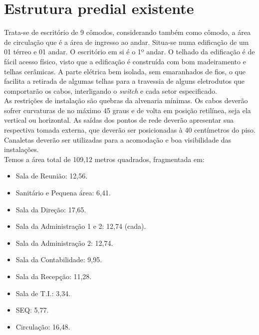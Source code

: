 \documentclass[	DIV=calc,%
							paper=a4,%
							fontsize=12pt,%
							onecolumn]{scrartcl}	 					%
\begin{document}
\pagebreak
\section{Estrutura predial existente}

Trata-se de escritório de 9 cômodos, considerando também como cômodo, a área de circulação que é a área de ingresso ao andar. Situa-se numa edificação de um 01 térreo e 01 andar. O escritório em si é o 1º andar. O telhado da edificação é de fácil acesso físico, visto que a edificação é construída com bom madeiramento e telhas cerâmicas. A parte elétrica bem isolada, sem emaranhados de fios, o que facilita a retirada de algumas telhas para a travessia de alguns eletrodutos que comportarão os cabos, interligando o \textit{switch} e cada setor especificado. \\

As restrições de instalação são quebras da alvenaria mínimas. Os cabos deverão sofrer curvaturas de no máximo 45 graus e de volta em posição retilínea, seja ela vertical ou horizontal. As saídas dos pontos de rede deverão apresentar sua respectiva tomada externa, que deverão ser posicionadas à 40 centímetros do piso. Canaletas deverão ser utilizadas para a acomodação e boa visibilidade das instalações.
\\

Temos a área total de 109,12 metros quadrados, fragmentada em:

\begin{itemize}
	\item Sala de Reunião: 12,56.
	\item Sanitário e Pequena área: 6,41.
	\item Sala da Direção: 17,65.
	\item Sala da Administração 1 e 2: 12,74 (cada).
	\item Sala da Administração 2: 12,74.
	\item Sala da Contabilidade: 9,95.
	\item Sala da Recepção: 11,28.
	\item Sala de T.I.: 3,34.
	\item SEQ: 5,77.
	\item Circulação: 16,48.
	
	
\end{itemize}


\clearpage 
\thispagestyle{plain}

\recalctypearea
\end{document}
